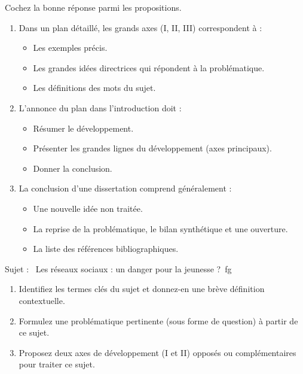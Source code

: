 \documentclass[11pt]{article}
\begin{document}
\begin{exercice}
Cochez la bonne réponse parmi les propositions.
\begin{enumerate}
    \item Dans un plan détaillé, les grands axes (I, II, III) correspondent à :
    \begin{itemize}
        \item[A.] Les exemples précis.
        \item[B.] Les grandes idées directrices qui répondent à la problématique.
        \item[C.] Les définitions des mots du sujet.
    \end{itemize}
    \item L'annonce du plan dans l'introduction doit :
    \begin{itemize}
        \item[A.] Résumer le développement.
        \item[B.] Présenter les grandes lignes du développement (axes principaux).
        \item[C.] Donner la conclusion.
    \end{itemize}
    \item La conclusion d'une dissertation comprend généralement :
    \begin{itemize}
        \item[A.] Une nouvelle idée non traitée.
        \item[B.] La reprise de la problématique, le bilan synthétique et une ouverture.
        \item[C.] La liste des références bibliographiques.
    \end{itemize}
\end{enumerate}
\end{exercice}

\begin{exercice}
Sujet : \og~Les réseaux sociaux : un danger pour la jeunesse ?~fg
\begin{enumerate}
    \item Identifiez les termes clés du sujet et donnez-en une brève définition contextuelle.
    \item Formulez une problématique pertinente (sous forme de question) à partir de ce sujet.
    \item Proposez deux axes de développement (I et II) opposés ou complémentaires pour traiter ce sujet.
\end{enumerate}
\end{exercice}
\end{document}
